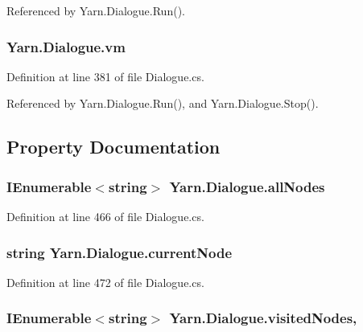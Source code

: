 Referenced by Yarn.\-Dialogue.\-Run().

\hypertarget{a00092_a8c1319357a9df6cff051328fb33224c7}{
\subsubsection[{vm}]{ Yarn.\-Dialogue.\-vm\hspace{0.3cm}{\ttfamily [private]}}}\label{a00092_a8c1319357a9df6cff051328fb33224c7}


Definition at line 381 of file Dialogue.\-cs.



Referenced by Yarn.\-Dialogue.\-Run(), and Yarn.\-Dialogue.\-Stop().



\subsection{Property Documentation}
\hypertarget{a00092_a0ee573e3d072bccf98ba1d975612d42c}{
\subsubsection[{all\-Nodes}]{\setlength{\rightskip}{0pt plus 5cm}I\-Enumerable$<$string$>$ Yarn.\-Dialogue.\-all\-Nodes\hspace{0.3cm}{\ttfamily [get]}}}\label{a00092_a0ee573e3d072bccf98ba1d975612d42c}


Definition at line 466 of file Dialogue.\-cs.

\hypertarget{a00092_af368b5c342d585dc6953876c5965ccc8}{
\subsubsection[{current\-Node}]{\setlength{\rightskip}{0pt plus 5cm}string Yarn.\-Dialogue.\-current\-Node\hspace{0.3cm}{\ttfamily [get]}}}\label{a00092_af368b5c342d585dc6953876c5965ccc8}


Definition at line 472 of file Dialogue.\-cs.

\hypertarget{a00092_ac5661051e0b7f44527fe526c7766dbbf}{
\subsubsection[{visited\-Nodes}]{\setlength{\rightskip}{0pt plus 5cm}I\-Enumerable$<$string$>$ Yarn.\-Dialogue.\-visited\-Nodes\hspace{0.3cm}{\ttfamily [get]}, {\ttfamily [set]}}}\label{a00092_ac5661051e0b7f44527fe526c7766dbbf}


